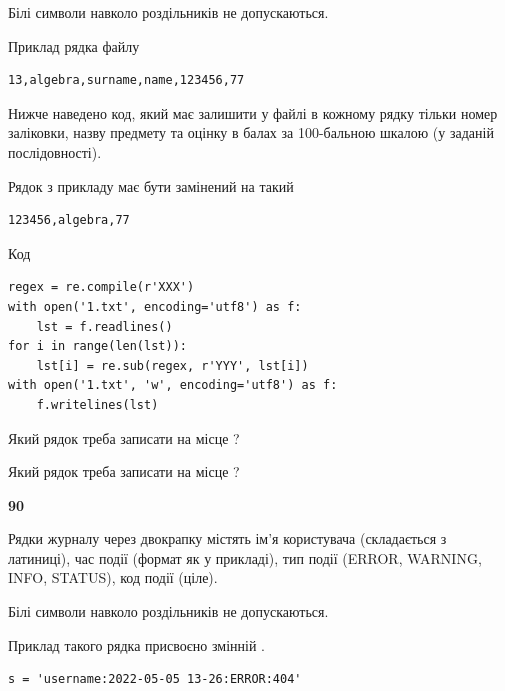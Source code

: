 Білі символи навколо роздільників не допускаються.

Приклад рядка файлу



\begin{verbatim}
13,algebra,surname,name,123456,77
\end{verbatim}


Нижче наведено код, який має залишити у файлі в кожному рядку тільки номер заліковки, назву предмету та оцінку в балах за 100-бальною шкалою (у заданій послі\-дов\-ності).

Рядок з прикладу має бути замінений на такий



\begin{verbatim}
123456,algebra,77
\end{verbatim}




Код



\begin{verbatim}
regex = re.compile(r'XXX')
with open('1.txt', encoding='utf8') as f:
    lst = f.readlines()
for i in range(len(lst)):
    lst[i] = re.sub(regex, r'YYY', lst[i])
with open('1.txt', 'w', encoding='utf8') as f:
    f.writelines(lst)
\end{verbatim}







Який рядок треба записати на місце  ?\par
\vspace{5mm}


Який рядок треба записати на місце  ?\par


\newpage

{\begin {center}\textbf{ 90}\end {center}}\par
Рядки журналу через двокрапку містять ім'я користувача (складається з латиниці), час події (фор\-мат як у прикладі), тип події (ERROR, WARNING, INFO, STATUS), код події (ціле).

Білі символи навколо роздільників не допускаються.

Приклад такого рядка присвоєно змінній .



\begin{verbatim}
s = 'username:2022-05-05 13-26:ERROR:404'
\end{verbatim}


